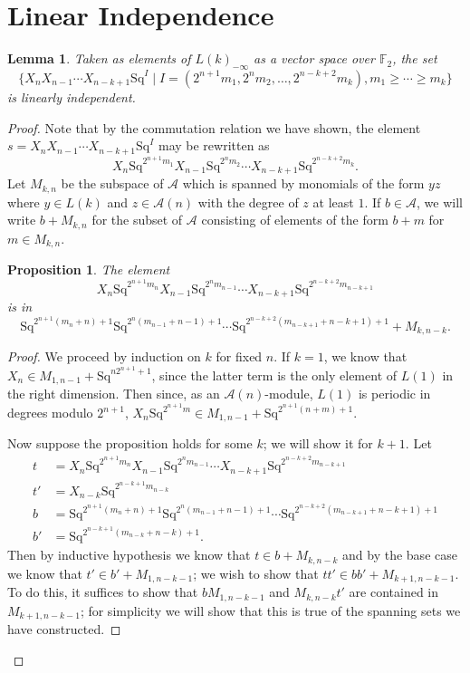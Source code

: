 \documentclass{article}
\newcommand{\A}{\mathcal{A}}
\newcommand{\F}{\mathbb{F}}
\newcommand{\Sq}{\mathrm{Sq}}
\newcommand{\Lkm}[1][k]{L{(#1)}_{-\infty}}
\newtheorem{prop}{Proposition}
\newtheorem{lem}{Lemma}
\begin{document}
\section{Linear Independence}

\begin{lem}\label{lem:li-vs}
  Taken as elements of $\Lkm$ as a vector space over $\F_2$, the set
  \[\{X_nX_{n-1}\cdots X_{n-k+1}\Sq^I\mid I=(2^{n+1}m_1,2^nm_2,\ldots,2^{n-k+2}m_k), m_1\geq\cdots\geq m_k\}\]
  is linearly independent.
\end{lem}
\begin{proof}
  Note that by the commutation relation we have shown, the element $s=X_nX_{n-1}\cdots X_{n-k+1}\Sq^I$ may be rewritten as
  \[X_n\Sq^{2^{n+1}m_1}X_{n-1}\Sq^{2^nm_2}\cdots X_{n-k+1}\Sq^{2^{n-k+2}m_k}.\]
  Let $M_{k,n}$ be the subspace of $\A$ which is spanned by monomials of the form $yz$ where $y\in L(k)$ and $z\in \A(n)$ with the degree of $z$ at least $1$.  If $b\in \A$, we will write $b+M_{k,n}$ for the subset of $\A$ consisting of elements of the form $b+m$ for $m\in M_{k,n}$.

  \begin{prop}\label{prop:m-thing}
    The element
    \[X_n\Sq^{2^{n+1}m_n}X_{n-1}\Sq^{2^nm_{n-1}}\cdots X_{n-k+1}\Sq^{2^{n-k+2}m_{n-k+1}}\]
    is in
    \[\Sq^{2^{n+1}(m_n+n)+1}\Sq^{2^n(m_{n-1}+n-1)+1}\cdots\Sq^{2^{n-k+2}(m_{n-k+1}+n-k+1)+1} + M_{k,n-k}.\]
  \end{prop}
  \begin{proof}

  We proceed by induction on $k$ for fixed $n$.  If $k=1$, we know that $X_n\in M_{1,n-1}+\Sq^{n2^{n+1}+1}$, since the latter term is the only element of $L(1)$ in the right dimension.  Then since, as an $\A(n)$-module, $L(1)$ is periodic in degrees modulo $2^{n+1}$, $X_n\Sq^{2^{n+1}m}\in M_{1,n-1}+\Sq^{2^{n+1}(n+m)+1}$.

  Now suppose the proposition holds for some $k$; we will show it for $k+1$.  Let 
  \begin{align*}
  t&=X_n\Sq^{2^{n+1}m_n}X_{n-1}\Sq^{2^nm_{n-1}}\cdots X_{n-k+1}\Sq^{2^{n-k+2}m_{n-k+1}} \\
  t'&=X_{n-k}\Sq^{2^{n-k+1}m_{n-k}} \\
  b&=\Sq^{2^{n+1}(m_n+n)+1}\Sq^{2^n(m_{n-1}+n-1)+1}\cdots\Sq^{2^{n-k+2}(m_{n-k+1}+n-k+1)+1} \\
  b'&=\Sq^{2^{n-k+1}(m_{n-k}+n-k)+1}.
  \end{align*}
  Then by inductive hypothesis we know that $t\in b+M_{k,n-k}$ and by the base case we know that $t'\in b'+M_{1,n-k-1}$; we wish to show that $tt'\in bb'+M_{k+1,n-k-1}$.  To do this, it suffices to show that $bM_{1,n-k-1}$ and $M_{k,n-k}t'$ are contained in $M_{k+1,n-k-1}$; for simplicity we will show that this is true of the spanning sets we have constructed.
  

\end{proof}
\end{proof}
\end{document}
